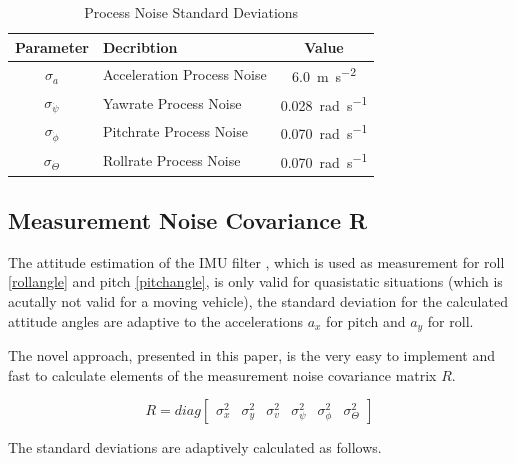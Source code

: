 \documentclass[a4paper,twoside]{article}
\begin{document}
\begin{table}[ht]
\renewcommand{\arraystretch}{1.3}
\caption{Process Noise Standard Deviations}
\label{processnoisetable}
\centering
\begin{tabular}{c l c}
\hline
Parameter & Decribtion & Value\\
\hline
$\sigma_a$ & Acceleration Process Noise & \SI{6.0}{\metre\per\square\second} \\
$\sigma_{\dot \psi}$ & Yawrate Process Noise & \SI{0.028}{\radian\per\second}\\
$\sigma_{\dot \phi}$ & Pitchrate Process Noise & \SI{0.070}{\radian\per\second}\\
$\sigma_{\dot \Theta}$ & Rollrate Process Noise & \SI{0.070}{\radian\per\second}\\
\hline
\end{tabular}
\end{table}

\subsection{Measurement Noise Covariance R}

The attitude estimation of the IMU filter \cite{Madgwick2010}, which is used as measurement for roll \eqref{rollangle} and pitch \eqref{pitchangle}, is only valid for quasistatic situations (which is acutally not valid for a moving vehicle), the standard deviation for the calculated attitude angles are adaptive to the accelerations $a_x$ for pitch and $a_y$ for roll.

The novel approach, presented in this paper, is the very easy to implement and fast to calculate elements of the measurement noise covariance matrix $R$.

\begin{equation}\label{R}R=diag\left[\begin{matrix}\sigma_{x}^2 & \sigma_{y}^2 & \sigma_{v}^2 & \sigma_{\psi}^2 & \sigma_{\phi}^2 & \sigma_{\Theta}^2 \end{matrix}\right]\end{equation}

The standard deviations are adaptively calculated as follows.
\end{document}
